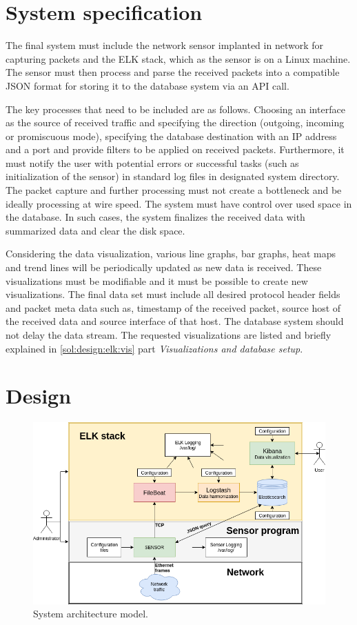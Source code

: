 \documentclass[12pt,a4paper,twoside]{report}
\begin{document}
	\section{System specification} \label{solution:spec}
		The final system must include the network sensor implanted in network for capturing packets and the ELK stack, which as the sensor is on a Linux machine. The sensor must then process and parse the received packets into a compatible JSON format for storing it to the database system via an API call.\par
		The key processes that need to be included are as follows. Choosing an interface as the source of received traffic and specifying the direction (outgoing, incoming or promiscuous mode), specifying the database destination with an IP address and a port and provide filters to be applied on received packets. Furthermore, it must notify the user with potential errors or successful tasks (such as initialization of the sensor) in standard log files in designated system directory. The packet capture and further processing must not create a bottleneck and be ideally processing at wire speed. The system must have control over used space in the database. In such cases, the system finalizes the received data with summarized data and clear the disk space.\par
		Considering the data visualization, various line graphs, bar graphs, heat maps and trend lines will be periodically updated as new data is received. These visualizations must be modifiable and it must be possible to create new visualizations. The final data set must include all desired protocol header fields and packet meta data such as, timestamp of the received packet, source host of the received data and source interface of that host. The database system should not delay the data stream. The requested visualizations are listed and briefly explained in \autoref{sol:design:elk:vis} part \emph{Visualizations and database setup}.
	\section{Design} \label{solution:design}
		\begin{figure}
			\centering
			\includegraphics[scale=0.5]{architecture}
			\caption{System architecture model.}
			\label{figure:sol:architecture}
		\end{figure}
\end{document}
